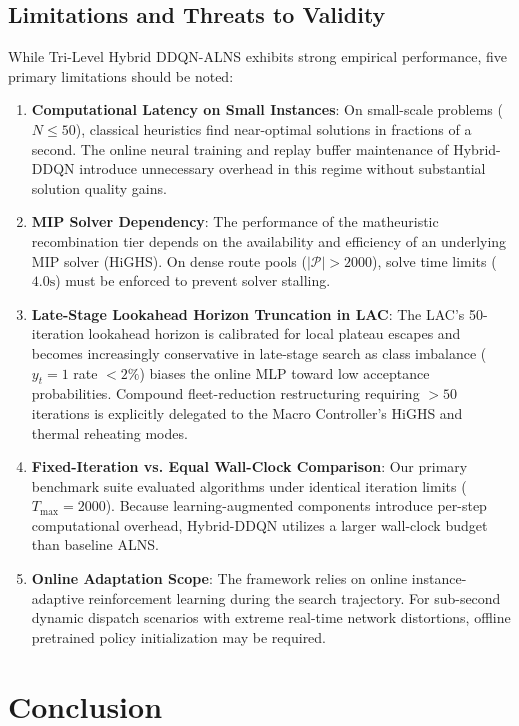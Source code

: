 \documentclass{ieeeaccess}
\begin{document}
\subsection{Limitations and Threats to Validity}
\label{sec:disc_limitations}

While Tri-Level Hybrid DDQN-ALNS exhibits strong empirical performance, five primary limitations should be noted:
\begin{enumerate}
    \item \textbf{Computational Latency on Small Instances}: On small-scale problems ($N \le 50$), classical heuristics find near-optimal solutions in fractions of a second. The online neural training and replay buffer maintenance of Hybrid-DDQN introduce unnecessary overhead in this regime without substantial solution quality gains.
    \item \textbf{MIP Solver Dependency}: The performance of the matheuristic recombination tier depends on the availability and efficiency of an underlying MIP solver (HiGHS). On dense route pools ($|\mathcal{P}| > 2000$), solve time limits ($4.0\text{s}$) must be enforced to prevent solver stalling.
    \item \textbf{Late-Stage Lookahead Horizon Truncation in LAC}: The LAC's 50-iteration lookahead horizon is calibrated for local plateau escapes and becomes increasingly conservative in late-stage search as class imbalance ($y_t = 1$ rate $< 2\%$) biases the online MLP toward low acceptance probabilities. Compound fleet-reduction restructuring requiring $> 50$ iterations is explicitly delegated to the Macro Controller's HiGHS and thermal reheating modes.
    \item \textbf{Fixed-Iteration vs. Equal Wall-Clock Comparison}: Our primary benchmark suite evaluated algorithms under identical iteration limits ($T_{\max} = 2000$). Because learning-augmented components introduce per-step computational overhead, Hybrid-DDQN utilizes a larger wall-clock budget than baseline ALNS.
    \item \textbf{Online Adaptation Scope}: The framework relies on online instance-adaptive reinforcement learning during the search trajectory. For sub-second dynamic dispatch scenarios with extreme real-time network distortions, offline pretrained policy initialization may be required.
\end{enumerate}

\section{Conclusion}
\label{sec:conclusion}
\end{document}

